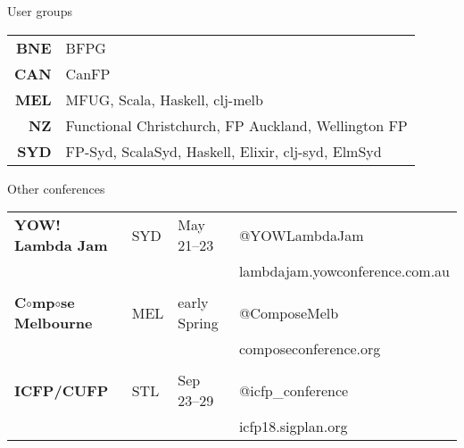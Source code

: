 \documentclass[ignorenonframetext,aspectratio=169]{beamer}
\begin{document}
\begin{frame}{User groups}

\centering
\begin{tabular}{r l}
{\bf BNE} & BFPG \\
{\bf CAN} & CanFP \\
{\bf MEL} & MFUG, Scala, Haskell, clj-melb \\
{\bf  NZ} & Functional Christchurch, FP Auckland, Wellington FP \\
{\bf SYD} & FP-Syd, ScalaSyd, Haskell, Elixir, clj-syd, ElmSyd \\
\end{tabular}

\end{frame}

\begin{frame}{Other conferences}

\centering
\begin{tabular}{l l l l}
{\bf YOW! Lambda Jam} & SYD & May 21--23  & @YOWLambdaJam  \\
                      &     &             & lambdajam.yowconference.com.au \\
\\
{\bf C$\circ$mp$\circ$se Melbourne} & MEL & early Spring & @ComposeMelb \\
    & & & composeconference.org \\
\\
{\bf ICFP/CUFP} & STL & Sep 23--29 & @icfp\_conference \\
    & & & icfp18.sigplan.org \\
\end{tabular}

\end{frame}
\end{document}
